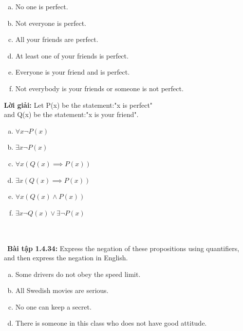 \documentclass[a4paper]{article}
\begin{document}
\begin{enumerate}[a)]
\item No one is perfect.
\item Not everyone is perfect.
\item All your friends are perfect.
\item At least one of your friends is perfect.
\item Everyone is your friend and is perfect.
\item Not everybody is your friends or someone is not perfect.
\end{enumerate}
\textbf{Lời giải:} Let P(x) be the statement:"x is perfect"\\
and Q(x) be the statement:"x is your friend".
\begin{enumerate}[a)]
\item $\forall x \lnot P(x)$
\item $\exists x \lnot P(x)$
\item $\forall x(Q(x) \implies P(x))$
\item $\exists x (Q(x) \implies P(x))$
\item $\forall x (Q(x) \land P(x))$
\item $\exists x \lnot Q(x) \lor \exists \lnot P(x)$
\end{enumerate} 
 \\\ \\\
\textbf{Bài tập 1.4.34: }Express the negation of these propositions using quantifiers, and then express the negation in English.
 \begin{enumerate}[a)]
\item Some drivers do not obey the speed limit.
\item All Swedish movies are serious.
\item No one can keep a secret. 
\item There is someone in this class who does not have  good attitude.
\end{enumerate} 
\end{document}
